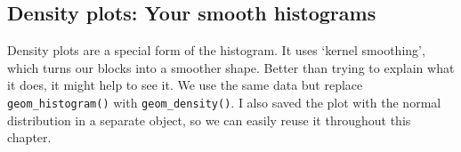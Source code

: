 \documentclass[
  letterpaper,
  DIV=11,
  numbers=noendperiod]{scrreprt}
\newenvironment{Shaded}{\begin{snugshade}}{\end{snugshade}}
\newcommand{\AttributeTok}[1]{\textcolor[rgb]{0.40,0.45,0.13}{#1}}
\newcommand{\CommentTok}[1]{\textcolor[rgb]{0.37,0.37,0.37}{#1}}
\newcommand{\DecValTok}[1]{\textcolor[rgb]{0.68,0.00,0.00}{#1}}
\newcommand{\FunctionTok}[1]{\textcolor[rgb]{0.28,0.35,0.67}{#1}}
\newcommand{\NormalTok}[1]{\textcolor[rgb]{0.00,0.23,0.31}{#1}}
\newcommand{\OtherTok}[1]{\textcolor[rgb]{0.00,0.23,0.31}{#1}}
\newcommand{\SpecialCharTok}[1]{\textcolor[rgb]{0.37,0.37,0.37}{#1}}
\newcommand{\StringTok}[1]{\textcolor[rgb]{0.13,0.47,0.30}{#1}}
\begin{document}
\subsection{Density plots: Your smooth
histograms}\label{density-plots-your-smooth-histograms}

Density plots are a special form of the histogram. It uses `kernel
smoothing', which turns our blocks into a smoother shape. Better than
trying to explain what it does, it might help to see it. We use the same
data but replace \texttt{geom\_histogram()} with
\texttt{geom\_density()}. I also saved the plot with the normal
distribution in a separate object, so we can easily reuse it throughout
this chapter.

\begin{Shaded}
\end{Shaded}
\end{document}
